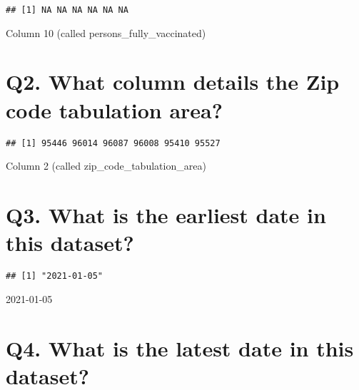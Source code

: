 \documentclass[
]{article}
\newenvironment{Shaded}{\begin{snugshade}}{\end{snugshade}}
\newcommand{\DecValTok}[1]{\textcolor[rgb]{0.00,0.00,0.81}{#1}}
\newcommand{\FunctionTok}[1]{\textcolor[rgb]{0.00,0.00,0.00}{#1}}
\newcommand{\NormalTok}[1]{#1}
\newcommand{\SpecialCharTok}[1]{\textcolor[rgb]{0.00,0.00,0.00}{#1}}
\begin{document}
\begin{verbatim}
## [1] NA NA NA NA NA NA
\end{verbatim}

Column 10 (called persons\_fully\_vaccinated)

\hypertarget{q2.-what-column-details-the-zip-code-tabulation-area}{%
\section{Q2. What column details the Zip code tabulation
area?}\label{q2.-what-column-details-the-zip-code-tabulation-area}}

\begin{Shaded}
\end{Shaded}

\begin{verbatim}
## [1] 95446 96014 96087 96008 95410 95527
\end{verbatim}

Column 2 (called zip\_code\_tabulation\_area)

\hypertarget{q3.-what-is-the-earliest-date-in-this-dataset}{%
\section{Q3. What is the earliest date in this
dataset?}\label{q3.-what-is-the-earliest-date-in-this-dataset}}

\begin{Shaded}
\end{Shaded}

\begin{verbatim}
## [1] "2021-01-05"
\end{verbatim}

2021-01-05

\hypertarget{q4.-what-is-the-latest-date-in-this-dataset}{%
\section{Q4. What is the latest date in this
dataset?}\label{q4.-what-is-the-latest-date-in-this-dataset}}
\end{document}
